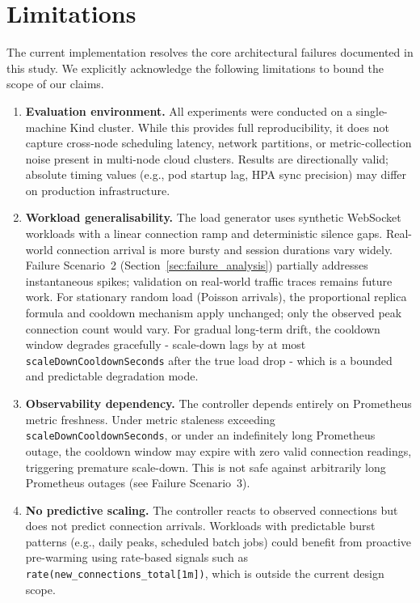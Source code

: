 \documentclass[twocolumn]{svjour3}
\begin{document}
\section{Limitations}
\label{sec:limitations}

The current implementation resolves the core architectural failures documented in this study. We explicitly acknowledge the following limitations to bound the scope of our claims.

\begin{enumerate}[leftmargin=*]

\item \textbf{Evaluation environment.} All experiments were conducted on a single-machine Kind cluster. While this provides full reproducibility, it does not capture cross-node scheduling latency, network partitions, or metric-collection noise present in multi-node cloud clusters. Results are directionally valid; absolute timing values (e.g., pod startup lag, HPA sync precision) may differ on production infrastructure.

\item \textbf{Workload generalisability.} The load generator uses synthetic WebSocket workloads with a linear connection ramp and deterministic silence gaps. Real-world connection arrival is more bursty and session durations vary widely. Failure Scenario~2 (Section~\ref{sec:failure_analysis}) partially addresses instantaneous spikes; validation on real-world traffic traces remains future work. For stationary random load (Poisson arrivals), the proportional replica formula and cooldown mechanism apply unchanged; only the observed peak connection count would vary. For gradual long-term drift, the cooldown window degrades gracefully - scale-down lags by at most \texttt{scaleDownCooldownSeconds} after the true load drop - which is a bounded and predictable degradation mode.

\item \textbf{Observability dependency.} The controller depends entirely on Prometheus metric freshness. Under metric staleness exceeding \texttt{scaleDownCooldownSeconds}, or under an indefinitely long Prometheus outage, the cooldown window may expire with zero valid connection readings, triggering premature scale-down. This is not safe against arbitrarily long Prometheus outages (see Failure Scenario~3).

\item \textbf{No predictive scaling.} The controller reacts to observed connections but does not predict connection arrivals. Workloads with predictable burst patterns (e.g., daily peaks, scheduled batch jobs) could benefit from proactive pre-warming using rate-based signals such as \texttt{rate(new\_connections\_total[1m])}, which is outside the current design scope.


\end{enumerate}
\end{document}
